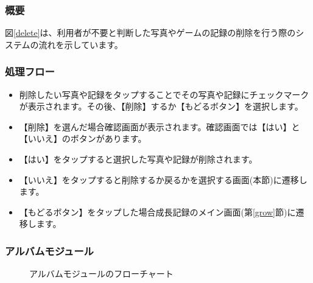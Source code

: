 \documentclass[a4j]{jarticle}
\begin{document}
\subsubsection*{概要}
図\ref{delete}は、利用者が不要と判断した写真やゲームの記録の削除を行う際のシステムの流れを示しています。

\subsubsection*{処理フロー}
\begin{itemize}
\item 削除したい写真や記録をタップすることでその写真や記録にチェックマークが表示されます。その後、【削除】するか【もどるボタン】を選択します。
\item 【削除】を選んだ場合確認画面が表示されます。確認画面では【はい】と【いいえ】のボタンがあります。
\item 【はい】をタップすると選択した写真や記録が削除されます。
\item 【いいえ】をタップすると削除するか戻るかを選択する画面(本節)に遷移します。
\item 【もどるボタン】をタップした場合成長記録のメイン画面(第\ref{grow}節)に遷移します。
\end{itemize}

\subsubsection{アルバムモジュール\label{Albam}}
\begin{figure}[H]
    \begin{center}
    \caption {アルバムモジュールのフローチャート}
    \label{albam}
    \end{center}
\end{figure}
\end{document}
